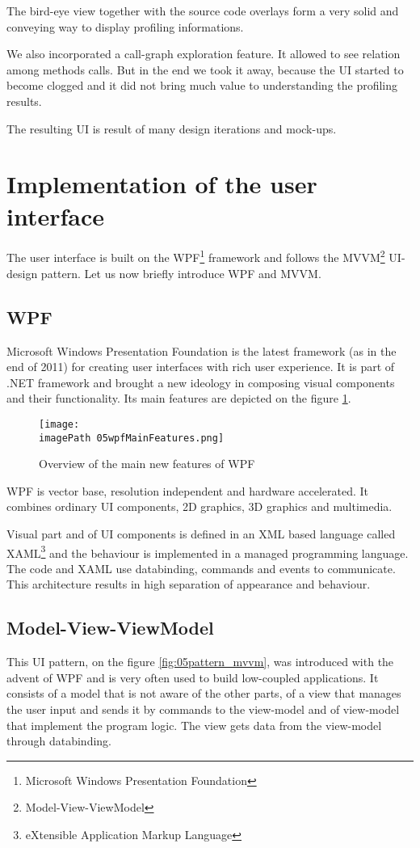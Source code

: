 The bird-eye view together with the source code overlays form a very solid and conveying way to display profiling informations. 

We also incorporated a call-graph exploration feature. It allowed to see relation among methods calls. But in the end we took it away, because the UI started to become clogged and it did not bring much value to understanding the profiling results. 

The resulting UI is result of many design iterations and mock-ups.

\section{Implementation of the user interface}
The user interface is built on the WPF\footnote{Microsoft Windows Presentation Foundation} framework \cite{WPF4Unleashed} and follows the MVVM\footnote{Model-View-ViewModel} \cite{MVVM2011} UI-design pattern. Let us now briefly introduce WPF and MVVM.

\subsection{WPF}
Microsoft Windows Presentation Foundation is the latest framework (as in the end of 2011) for creating user interfaces with rich user experience. It is part of .NET framework and brought a new ideology in composing visual components and their functionality. Its main features are depicted on the figure \ref{fig:05wpfMainFeatures}.

\begin{figure}
	\centering
		\texttt{[image: \\imagePath 05wpfMainFeatures.png]}
		\caption{Overview of the main new features of WPF \cite{WPFpage}}
	\label{fig:05wpfMainFeatures}
\end{figure}

WPF is vector base, resolution independent and hardware accelerated. It combines ordinary UI components, 2D graphics, 3D graphics and multimedia. 

Visual part and of UI components is defined in an XML based language called \linebreak XAML\footnote{eXtensible Application Markup Language} and the behaviour is implemented in a managed programming language. The code and XAML use databinding, commands and events to communicate. This architecture results in high separation of appearance and behaviour.

\subsection{Model-View-ViewModel}
This UI pattern, on the figure \ref{fig:05pattern_mvvm}, was introduced with the advent of WPF and is very often used to build low-coupled applications. It consists of a model that is not aware of the other parts, of a view that manages the user input and sends it by commands to the view-model and of view-model that implement the program logic. The view gets data from the view-model through databinding.


